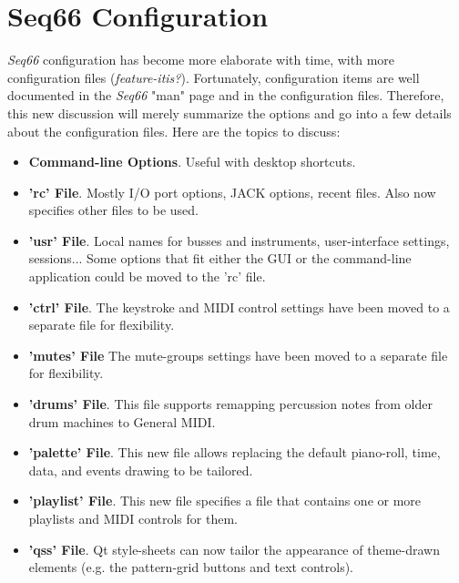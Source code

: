 %
%
%

\section{Seq66 Configuration}
\label{sec:configuration}

   \textsl{Seq66} configuration has become more elaborate with time, with more
   configuration files (\textsl{feature-itis?}).
   Fortunately, configuration items are well documented in the
   \textsl{Seq66} "man" page and in the configuration files.
   Therefore, this new discussion will merely summarize the options and
   go into a few details about the configuration files.
   Here are the topics to discuss:

   \begin{itemize}
      \item \textbf{Command-line Options}. Useful with desktop shortcuts.
      \item \textbf{'rc' File}. Mostly I/O port options, JACK options, recent
         files.  Also now specifies other files to be used.
      \item \textbf{'usr' File}. Local names for busses and instruments,
         user-interface settings, sessions... Some options that fit either the
         GUI or the command-line application could be moved to the 'rc' file.
      \item \textbf{'ctrl' File}. The keystroke and MIDI control settings have
         been moved to a separate file for flexibility.
      \item \textbf{'mutes' File} The mute-groups settings have
         been moved to a separate file for flexibility.
      \item \textbf{'drums' File}.  This file supports remapping percussion
         notes from older drum machines to General MIDI.
      \item \textbf{'palette' File}. This new file allows replacing the default
         piano-roll, time, data, and events drawing to be tailored.
      \item \textbf{'playlist' File}. This new file specifies a file that
         contains one or more playlists and MIDI controls for them.
      \item \textbf{'qss' File}.  Qt style-sheets can now tailor the appearance
      of theme-drawn elements (e.g. the pattern-grid buttons and text controls).
   \end{itemize}


